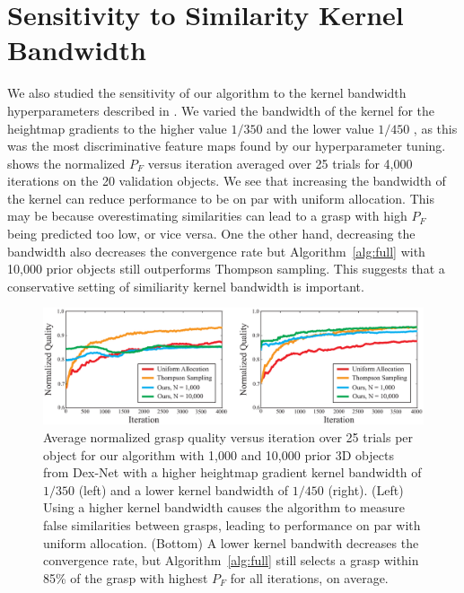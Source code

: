 \section{Sensitivity to Similarity Kernel Bandwidth}
We also studied the sensitivity of our algorithm to the kernel bandwidth hyperparameters described in .
We varied the bandwidth of the kernel for the heightmap gradients to the higher value $1 / 350$ and the lower value $1 / 450$ , as this was the most discriminative feature maps found by our hyperparameter tuning.
 shows the normalized $P_F$ versus iteration averaged over 25 trials for 4,000 iterations on the 20 validation objects.
We see that increasing the bandwidth of the kernel can reduce performance to be on par with uniform allocation.
This may be because overestimating similarities can lead to a grasp with high $P_F$ being predicted too low, or vice versa.
One the other hand, decreasing the bandwidth also decreases the convergence rate but Algorithm~\ref{alg:full} with 10,000 prior objects still outperforms Thompson sampling.
This suggests that a conservative setting of similiarity kernel bandwidth is important.

\begin{figure}[t!]
\centering
\includegraphics[scale=0.23]{figures/illustrations/weight_sensitivity.eps}
\caption{Average normalized grasp quality versus iteration over 25 trials per object for our algorithm with 1,000 and 10,000 prior 3D objects from Dex-Net with a higher heightmap gradient kernel bandwidth of $1 / 350$ (left) and a lower kernel bandwidth of $1 / 450$ (right). (Left) Using a higher kernel bandwidth causes the algorithm to measure false similarities between grasps, leading to performance on par with uniform allocation. (Bottom) A lower kernel bandwith decreases the convergence rate, but Algorithm~\ref{alg:full} still selects a grasp within 85\% of the grasp with highest $P_F$ for all iterations, on average.}
\vspace*{-10pt}
\end{figure}

